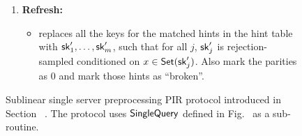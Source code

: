 \begin{figure}[p]
\begin{minipage}{\textwidth}
\begin{mdframed}
\begin{enumerate}[leftmargin=5mm,itemsep=1pt]
\begin{enumerate}[leftmargin=5mm,itemsep=1pt]
                    \item For each hint, do the following:
            \begin{itemize}
                \item if the hint is marked good, find the first unconsumed replacement entry $(r, \DB[r])$ from $x$'s chunk;
                and execute $\SingleQuery(x, \sk_j, p_j,r,\DB[r])$ and store the answer for the query.
                \item Otherwise, execute $\SingleQuery(x, \sk_j, 0,0,r')$ with a random index $r'$ from $x$'s chunk  and ignore the answer.
            \end{itemize}
                
            \item Return the answer of any of the good hints. If none of the hints were good, just return $0$.
                    
                \end{enumerate}
                
                \item 
                {\bf Refresh:}
                \begin{itemize}
                    \item \Client replaces all the keys for the matched hints in
                    the hint table with $\mathsf{sk}'_1,\dots,\mathsf{sk}'_m$, such that for all
                    $j$, $\mathsf{sk}'_j$ is rejection-sampled conditioned on $x\in
                    \mathsf{Set}(\mathsf{sk}'_j)$. Also mark the parities as 0 and mark those
                    hints as ``broken''.
                \end{itemize}
                
            \end{enumerate}
        \end{mdframed}
    \end{minipage}
    \caption{Sublinear single server preprocessing PIR protocol introduced in
    Section ~. The protocol uses $\mathsf{SingleQuery}$ defined
    in Fig.~ as a sub-routine.}
    \label{fig:single-server}
\end{figure}


